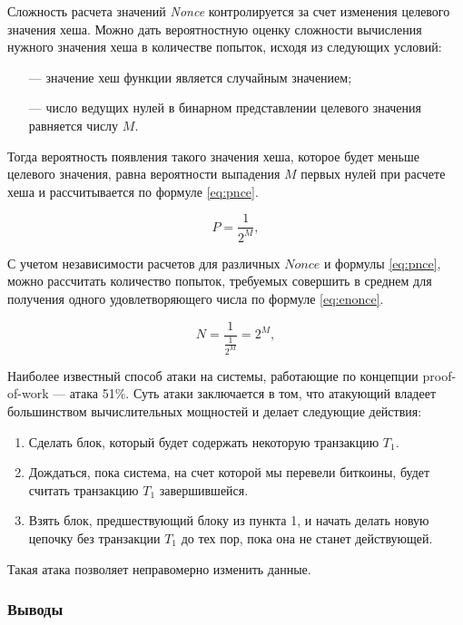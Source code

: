 Сложность расчета значений \textit{Nonce} контролируется за счет изменения целевого значения хеша. Можно дать вероятностную оценку сложности вычисления нужного значения хеша в количестве попыток, исходя из следующих условий:
\begin{itemize}
	\item[---] значение хеш функции является случайным значением;
	\item[---] число ведущих нулей в бинарном представлении целевого значения равняется числу $M$.
\end{itemize}

Тогда вероятность появления такого значения хеша, которое будет меньше целевого значения, равна вероятности выпадения $M$ первых нулей при расчете хеша и рассчитывается по формуле \ref{eq:pnce}.

\begin{equation}
\label{eq:pnce}
P = \frac{1}{2^M},
\end{equation}

С учетом независимости расчетов для различных $Nonce$ и формулы \ref{eq:pnce}, можно рассчитать количество попыток, требуемых совершить в среднем для получения одного удовлетворяющего числа по формуле \ref{eq:enonce}.

\begin{equation}
\label{eq:enonce}
N = \frac{1}{\frac{1}{2^M}} = 2^M,
\end{equation}

Наиболее известный способ атаки на системы, работающие по концепции proof-of-work --- атака 51\%. Суть атаки заключается в том, что атакующий владеет большинством вычислительных мощностей и делает следующие действия:
\begin{enumerate}
	\item Сделать блок, который будет содержать некоторую транзакцию $T_1$.
	\item Дождаться, пока система, на счет которой мы перевели биткоины, будет считать транзакцию $T_1$ завершившейся.
	\item Взять блок, предшествующий блоку из пункта 1, и начать делать новую цепочку без транзакции $T_1$ до тех пор, пока она не станет действующей.
\end{enumerate}

Такая атака позволяет неправомерно изменить данные.

\pagebreak

\subsubsection*{Выводы}


